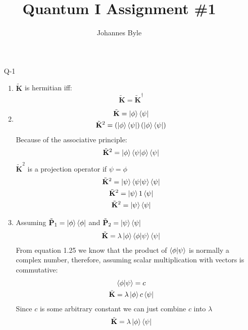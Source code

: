 \documentclass[12pt]{article}
\title{Quantum I Assignment \#1}
\author{Johannes Byle}
\newcommand{\op}[1]{\tilde{\mathbf{#1}}}
\begin{document}
    \maketitle
    \begin{enumerate}
        \item[Q-1]
        \begin{enumerate}
            \item $\op{K}$ is hermitian iff:
            \[
                \op{K}=\op{K}^{\dagger}
            \]
            \item
            \begin{gather*}
                \op{K}=\ket{\phi}\bra{\psi}\\
                \op{K}^2=\left(\ket{\phi}\bra{\psi}\right)\left(\ket{\phi}\bra{\psi}\right)
            \end{gather*}
            Because of the associative principle:
            \begin{gather*}
                \op{K}^2=\ket{\phi}\braket{\psi|\phi}\bra{\psi}
            \end{gather*}
            $\op{K}^2$ is a projection operator if $\psi=\phi$
            \begin{gather*}
                \op{K}^2=\ket{\psi}\braket{\psi|\psi}\bra{\psi}\\
                \op{K}^2=\ket{\psi}1\bra{\psi}\\
                \op{K}^2=\ket{\psi}\bra{\psi}
            \end{gather*}
            \item
            Assuming $\op{P}_1=\ket{\phi}\bra{\phi}$ and $\op{P}_2=\ket{\psi}\bra{\psi}$
            \begin{gather*}
                \op{K}=\lambda\ket{\phi}\braket{\phi|\psi}\bra{\psi}
            \end{gather*}
            From equation 1.25 we know that the product of $\braket{\phi|\psi}$ is normally a complex number, therefore, assuming scalar multiplication with vectors is commutative:
            \begin{gather*}
                \braket{\phi|\psi}=c\\
                \op{K}=\lambda\ket{\phi}c\bra{\psi}\\
            \end{gather*}
            Since $c$ is some arbitrary constant we can just combine $c$ into $\lambda$
            \begin{gather*}
                \op{K}=\lambda\ket{\phi}\bra{\psi}

\end{gather*}
\end{enumerate}
\end{enumerate}
\end{document}

